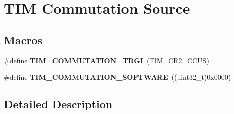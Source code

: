 \hypertarget{group___t_i_m___commutation___source}{}\section{T\+IM Commutation Source}
\label{group___t_i_m___commutation___source}
\subsection*{Macros}
\begin{DoxyCompactItemize}
\item 
\#define {\bfseries T\+I\+M\+\_\+\+C\+O\+M\+M\+U\+T\+A\+T\+I\+O\+N\+\_\+\+T\+R\+GI}~(\hyperlink{group___peripheral___registers___bits___definition_gaf0328c1339b2b1633ef7a8db4c02d0d5}{T\+I\+M\+\_\+\+C\+R2\+\_\+\+C\+C\+US})\hypertarget{group___t_i_m___commutation___source_gab2e11763b5e061a5b3056ac970f57ab1}{}\label{group___t_i_m___commutation___source_gab2e11763b5e061a5b3056ac970f57ab1}

\item 
\#define {\bfseries T\+I\+M\+\_\+\+C\+O\+M\+M\+U\+T\+A\+T\+I\+O\+N\+\_\+\+S\+O\+F\+T\+W\+A\+RE}~((uint32\+\_\+t)0x0000)\hypertarget{group___t_i_m___commutation___source_ga9cd117a69cbca219c1cf29e74746a496}{}\label{group___t_i_m___commutation___source_ga9cd117a69cbca219c1cf29e74746a496}

\end{DoxyCompactItemize}


\subsection{Detailed Description}
